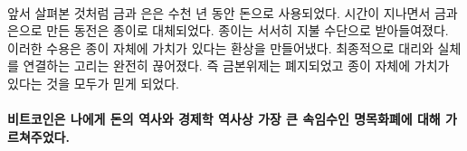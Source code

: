 \paragraph{}
\begin{comment}
	As we have seen, gold and silver were used as money for millennia. Over
	time, coins made from gold and silver were replaced by paper. Paper
	slowly became accepted as payment. This acceptance created an
	illusion --- the illusion that the paper itself has value. The final
	move was to completely sever the link between the representation and the
	actual: abolishing the gold standard and convincing everyone that the
	paper in itself is precious.
\end{comment}
앞서 살펴본 것처럼 금과 은은 수천 년 동안 돈으로 사용되었다. 
시간이 지나면서 금과 은으로 만든 동전은 종이로 대체되었다. 
종이는 서서히 지불 수단으로 받아들여졌다. 
이러한 수용은 종이 자체에 가치가 있다는 환상을 만들어냈다. 
최종적으로 대리와 실체를 연결하는 고리는 완전히 끊어졌다.
즉 금본위제는 폐지되었고 종이 자체에 가치가 있다는 것을 모두가 믿게 되었다.

\begin{comment}
	\paragraph{Bitcoin taught me about the history of money and the greatest sleight of
		hand in the history of economics: fiat currency.}
\end{comment}
\paragraph{비트코인은 나에게 돈의 역사와 경제학 역사상 가장 큰 속임수인 명목화폐에 대해 가르쳐주었다.}

%
%
%
%
